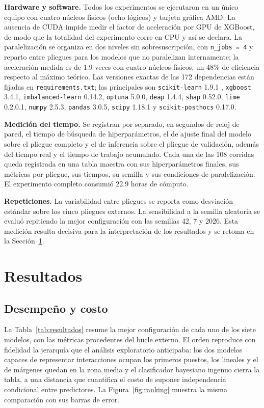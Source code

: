 \documentclass[pdflatex,sn-mathphys-num]{sn-jnl}
\begin{document}
\textbf{Hardware y software.} Todos los experimentos se ejecutaron en un único equipo con cuatro núcleos físicos (ocho lógicos) y tarjeta gráfica AMD. La ausencia de CUDA impide medir el factor de aceleración por GPU de XGBoost, de modo que la totalidad del experimento corre en CPU y así se declara. La paralelización se organiza en dos niveles sin sobresuscripción, con \texttt{n\_jobs = 4} y reparto entre pliegues para los modelos que no paralelizan internamente; la aceleración medida es de 1.9 veces con cuatro núcleos físicos, un 48\% de eficiencia respecto al máximo teórico. Las versiones exactas de las 172 dependencias están fijadas en \texttt{requirements.txt}; las principales son \texttt{scikit-learn} 1.9.1 \cite{bib_sklearn}, \texttt{xgboost} 3.4.1, \texttt{imbalanced-learn} 0.14.2, \texttt{optuna} 5.0.0, \texttt{deap} 1.4.4, \texttt{shap} 0.52.0, \texttt{lime} 0.2.0.1, \texttt{numpy} 2.5.3, \texttt{pandas} 3.0.5, \texttt{scipy} 1.18.1 y \texttt{scikit-posthocs} 0.17.0.

\textbf{Medición del tiempo.} Se registran por separado, en segundos de reloj de pared, el tiempo de búsqueda de hiperparámetros, el de ajuste final del modelo sobre el pliegue completo y el de inferencia sobre el pliegue de validación, además del tiempo real y el tiempo de trabajo acumulado. Cada una de las 108 corridas queda registrada en una tabla maestra con sus hiperparámetros finales, sus métricas por pliegue, sus tiempos, su semilla y sus condiciones de paralelización. El experimento completo consumió 22.9 horas de cómputo.

\textbf{Repeticiones.} La variabilidad entre pliegues se reporta como desviación estándar sobre los cinco pliegues externos. La sensibilidad a la semilla aleatoria se evaluó repitiendo la mejor configuración con las semillas 42, 7 y 2026. Esta medición resulta decisiva para la interpretación de los resultados y se retoma en la Sección~\ref{sec:resultados}.

\section{Resultados}\label{sec:resultados}

\subsection{Desempeño y costo}

La Tabla~\ref{tab:resultados} resume la mejor configuración de cada uno de los siete modelos, con las métricas procedentes del bucle externo. El orden reproduce con fidelidad la jerarquía que el análisis exploratorio anticipaba: los dos modelos capaces de representar interacciones ocupan los primeros puestos, los lineales y el de márgenes quedan en la zona media y el clasificador bayesiano ingenuo cierra la tabla, a una distancia que cuantifica el costo de suponer independencia condicional entre predictores. La Figura~\ref{fig:ranking} muestra la misma comparación con sus barras de error.
\end{document}
